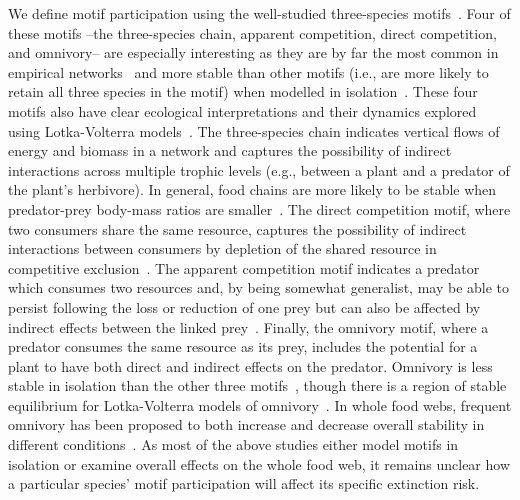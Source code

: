 \documentclass[12pt]{article}
\begin{document}
\begin{spacing}{2.0}
    We define motif participation using the well-studied three-species motifs~\citep{Milo2004,Stouffer2007,Stouffer2012}. 
    Four of these motifs --the three-species chain, apparent competition, direct competition, and omnivory-- are especially interesting as they are by far the most common in empirical networks~\citep{Stouffer2007, giling2019plant} and more stable than other motifs (i.e., are more likely to retain all three species in the motif) when modelled in isolation~\citep{Borrelli2015a}.
    These four motifs also have clear ecological interpretations and their dynamics explored using Lotka-Volterra models~\citep{Hsu2015}.
    The three-species chain indicates vertical flows of energy and biomass in a network and captures the possibility of indirect interactions across multiple trophic levels (e.g., between a plant and a predator of the plant's herbivore).
    In general, food chains are more likely to be stable when predator-prey body-mass ratios are smaller~\citep{Jonsson1998}.
    The direct competition motif, where two consumers share the same resource, captures the possibility of indirect interactions between consumers by depletion of the shared resource in competitive exclusion~\citep{Hsu2015}. 
    The apparent competition motif indicates a predator which consumes two resources and, by being somewhat generalist, may be able to persist following the loss or reduction of one prey but can also be affected by indirect effects between the linked prey~\citep{Melian2002}.
    Finally, the omnivory motif, where a predator consumes the same resource as its prey, includes  the potential for a plant to have both direct and indirect effects on the predator. 
    Omnivory is less stable in isolation than the other three motifs~\citep{Borrelli2015a}, though there is a region of stable equilibrium for Lotka-Volterra models of omnivory~\citep{Hsu2015}.
    In whole food webs, frequent omnivory has been proposed to both increase and decrease overall stability in different conditions~\citep{McCann1997,Emmerson2004,Monteiro2016}.
    As most of the above studies either model motifs in isolation or examine overall effects on the whole food web, it remains unclear how a particular species' motif participation will affect its specific extinction risk.


\end{spacing}
\end{document}
